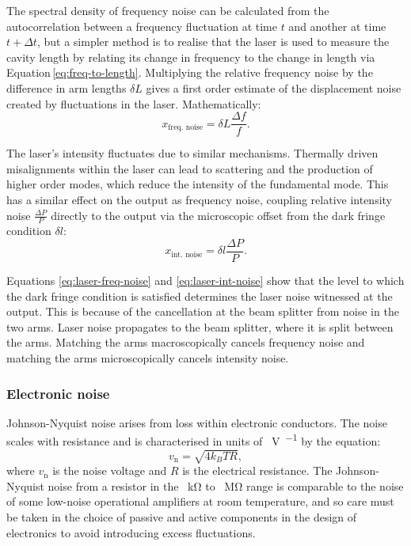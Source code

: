 The spectral density of frequency noise can be calculated from the autocorrelation between a frequency fluctuation at time $t$ and another at time $t + \Delta t$, but a simpler method is to realise that the laser is used to measure the cavity length by relating its change in frequency to the change in length via Equation\,\ref{eq:freq-to-length}. Multiplying the relative frequency noise by the difference in arm lengths $\delta L$ gives a first order estimate of the displacement noise created by fluctuations in the laser. Mathematically:
\begin{equation}
  \label{eq:laser-freq-noise}
  x_{\text{freq. noise}} = \delta L \frac{\Delta f}{f}.
\end{equation}

The laser's intensity fluctuates due to similar mechanisms. Thermally driven misalignments within the laser can lead to scattering and the production of higher order modes, which reduce the intensity of the fundamental mode. This has a similar effect on the output as frequency noise, coupling relative intensity noise $\frac{\Delta P}{P}$ directly to the output via the microscopic offset from the dark fringe condition $\delta l$:
\begin{equation}
  \label{eq:laser-int-noise}
  x_{\text{int. noise}} = \delta l \frac{\Delta P}{P}.
\end{equation}

Equations \ref{eq:laser-freq-noise} and \ref{eq:laser-int-noise} show that the level to which the dark fringe condition is satisfied determines the laser noise witnessed at the output. This is because of the cancellation at the beam splitter from noise in the two arms. Laser noise propagates to the beam splitter, where it is split between the arms. Matching the arms macroscopically cancels frequency noise and matching the arms microscopically cancels intensity noise.

\subsubsection{\label{sec:johnson-nyquist-noise}Electronic noise}
Johnson-Nyquist noise arises from loss within electronic conductors. The noise scales with resistance and is characterised in units of \SI{}{\volt\per\sqrthz} by the equation:
\begin{equation}
  v_{\text{n}} = \sqrt{4 k_B T R},
\end{equation}
where $v_{\text{n}}$ is the noise voltage and $R$ is the electrical resistance. The Johnson-Nyquist noise from a resistor in the \SI{}{\kilo\ohm} to \SI{}{\mega\ohm} range is comparable to the noise of some low-noise operational amplifiers at room temperature, and so care must be taken in the choice of passive and active components in the design of electronics to avoid introducing excess fluctuations.

